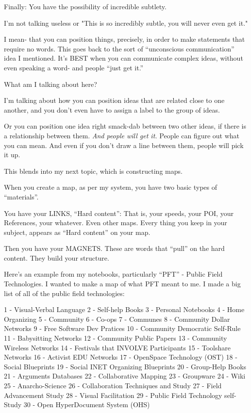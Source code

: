 \documentclass[oneside]{book}
\begin{document}
Finally: You have the possibility of incredible subtlety.

I'm not talking useless or "This is so incredibly subtle, you will
never even get it."

I mean- that you can position things, precisely, in order to make
statements that require no words. This goes back to the sort of
``unconscious communication'' idea I mentioned. It's BEST when you can
communicate complex ideas, without even speaking a word- and people
``just get it.''

What am I talking about here?

I'm talking about how you can position ideas that are related close to
one another, and you don't even have to assign a label to the group of
ideas.

Or you can position one idea right smack-dab between two other ideas,
if there is a relationship between them. \emph{And people will get it.}
People can figure out what you can mean. And even if you don't draw a
line between them, people will pick it up.

This blends into my next topic, which is constructing maps.

When you create a map, as per my system, you have two basic types of
``materials''.

You have your LINKS, ``Hard content'': That is, your speeds, your POI,
your References, your whatever. Even other maps. Every thing you keep
in your subject, appears as ``Hard content'' on your map.

Then you have your MAGNETS. These are words that ``pull'' on the hard
content. They build your structure.

Here's an example from my notebooks, particularly ``PFT'' - Public Field
Technologies. I wanted to make a map of what PFT meant to me. I made a
big list of all of the public field technologies:

1 - Visual-Verbal Language
2 - Self-help Books
3 - Personal Notebooks
4 - Home Organizing
5 - Community
6 - Co-ops
7 - Communes
8 - Community Dollar Networks
9 - Free Software Dev Pratices
10 - Community Democratic Self-Rule
11 - Babysitting Networks
12 - Community Public Papers
13 - Community Wireless Networks
14 - Festivals that INVOLVE Participants
15 - Toolshare Networks
16 - Activist EDU Networks
17 - OpenSpace Technology (OST)
18 - Social Blueprints
19 - Social INET Organizing Blueprints
20 - Group-Help Books
21 - Arguments Databases
22 - Collaborative Mapping
23 - Groupware
24 - Wiki
25 - Anarcho-Science
26 - Collaboration Techniques and Study
27 - Field Advancement Study
28 - Visual Facilitation
29 - Public Field Technology self-Study
30 - Open HyperDocument System (OHS)
\end{document}
